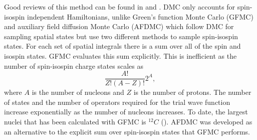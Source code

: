 Good reviews of this method can be found in \cite{foulkes2001} and  \cite{carlson2015}. DMC only accounts for spin-isospin independent Hamiltonians, unlike Green's function Monte Carlo (GFMC) and auxiliary field diffusion Monte Carlo (AFDMC) which follow DMC for sampling spatial states but use two different methods to sample spin-isospin states. For each set of spatial integrals there is a sum over all of the spin and isospin states. GFMC evaluates this sum explicitly. This is inefficient as the number of spin-isospin charge states scales as
\begin{equation}
   \frac{A!}{Z!(A-Z)!}2^A,
\end{equation}
where $A$ is the number of nucleons and $Z$ is the number of protons.
The number of states and the number of operators required for the trial wave function increase exponentially as the number of nucleons increases. To date, the largest nuclei that has been calculated with GFMC is ${}^{12}C$ (\cite{lovato2013,lovato2014,lovato2015}). AFDMC was developed as an alternative to the explicit sum over spin-isospin states that GFMC performs.

